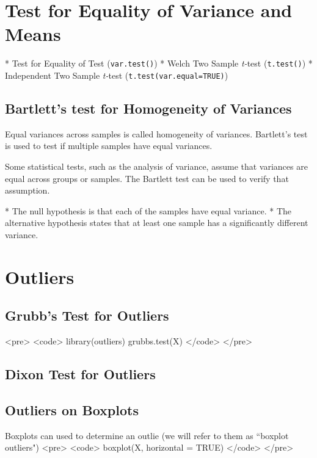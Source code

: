 



\section{Test for Equality of Variance and Means}

\begin{itemize}
* Test for Equality of Test (\texttt{var.test()})
* Welch Two Sample \emph{t-}test (\texttt{t.test()})
* Independent Two Sample \emph{t-}test (\texttt{t.test(var.equal=TRUE)})

\end{itemize}

\subsection{Bartlett's test for Homogeneity of Variances}
 

Equal variances across samples is called homogeneity of variances. Bartlett's test is used to test if multiple samples have equal variances. 

Some statistical tests, such as the analysis of variance, assume that variances are equal across groups or samples.  The Bartlett test can be used to verify that assumption.

\begin{itemize}
* The null hypothesis is that each of the samples have equal variance.
* The alternative hypothesis states that at least one sample has a significantly different variance.
\end{itemize}


\section{Outliers}
\subsection{Grubb's Test for Outliers}
<pre>
	<code>
	library(outliers)
	grubbs.test(X)
	</code>
</pre>
\subsection{Dixon Test for Outliers}
\subsection{Outliers on Boxplots}
Boxplots can used to determine an outlie (we will refer to them as ``boxplot outliers")
<pre>
	<code>
	boxplot(X, horizontal = TRUE)
	</code>
</pre>



